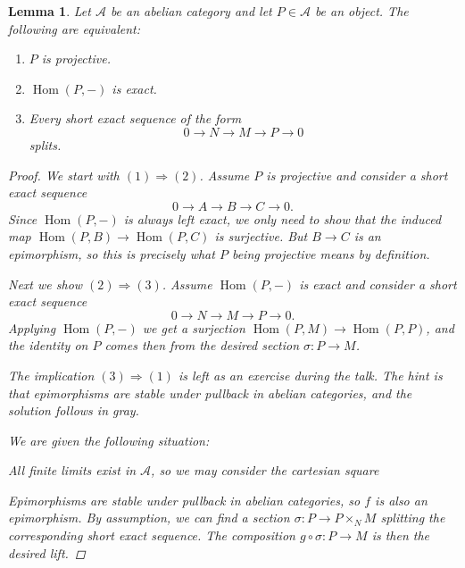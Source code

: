 \documentclass[A4paper, 12pt, british, reqno]{amsart}
\newcommand{\calA}{\mathcal{A}}
\theoremstyle{plain}
\newtheorem{lm}[thm]{Lemma}
\theoremstyle{definition}
\theoremstyle{remark}
\theoremstyle{plain}
\theoremstyle{definition}
\theoremstyle{remark}
\theoremstyle{plain}
\theoremstyle{definition}
\theoremstyle{remark}
\DeclareMathOperator{\Hom}{Hom}
\begin{document}
\begin{lm}\label{lm:projective}
    Let $\calA$ be an abelian category and let $P\in \calA$ be an object.
    The following are equivalent:
    \begin{enumerate}
	\item $P$ is projective.
	\item $\Hom(P,-)$ is exact.
	\item Every short exact sequence of the form
	    \[ 0 \to N\to M\to P\to 0 \]
	    splits.
    \end{enumerate}
    \begin{proof}
	We start with $(1)\Rightarrow (2)$.
	Assume $P$ is projective and consider a short exact sequence
	\[ 0 \to A\to B\to C\to 0. \]
	Since $\Hom(P,-)$ is always left exact, we only need to show that the induced map $\Hom(P,B)\to \Hom(P,C)$ is surjective.
	But $B\to C$ is an epimorphism, so this is precisely what $P$ being projective means by definition.

	Next we show $(2)\Rightarrow (3)$.
	Assume $\Hom(P,-)$ is exact and consider a short exact sequence
	\[ 0\to N\to M\to P\to 0. \]
	Applying $\Hom(P,-)$ we get a surjection $\Hom(P,M)\to \Hom(P,P)$, and the identity on $P$ comes then from the desired section $\sigma\colon P\to M$.

	The implication $(3)\Rightarrow (1)$ is left as an exercise during the talk.
	The hint is that epimorphisms are stable under pullback in abelian categories, and the solution follows in gray.
	{\color{gray}
	We are given the following situation:
	\begin{center}
	\end{center}
	All finite limits exist in $\calA$, so we may consider the cartesian square
	\begin{center}
	\end{center}
	Epimorphisms are stable under pullback in abelian categories, so $f$ is also an epimorphism.
	By assumption, we can find a section $\sigma\colon P\to P\times_{N}M$ splitting the corresponding short exact sequence.
	The composition $g\circ \sigma\colon P\to M$ is then the desired lift.
	}
    \end{proof}
\end{lm}
\end{document}
